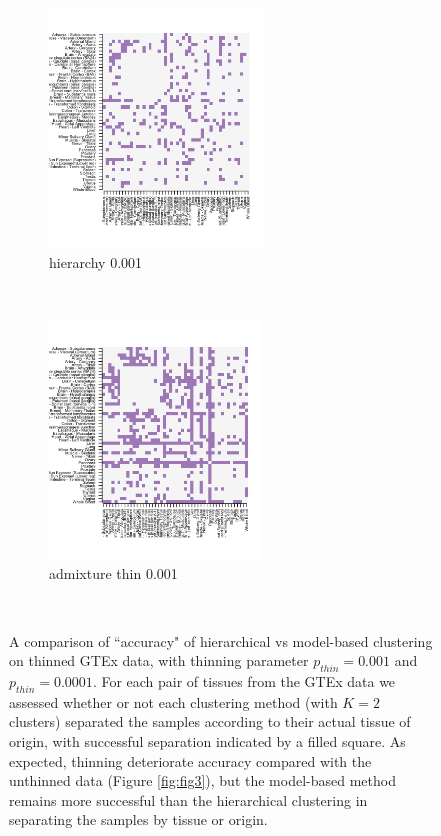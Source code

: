 \begin{figure}[ht]
     \begin{subfigure}[t]{0.5\textwidth}
        \centering
        \includegraphics[height=2.5in]{../plots/rsz_1hierarchy_F_thin_0_001.png}
        \caption{hierarchy 0.001}
    \end{subfigure}%
    ~
    \begin{subfigure}[t]{0.5\textwidth}
        \centering
        \includegraphics[height=2.5in]{../plots/rsz_1admixture_F_thin_0_001.png}
        \caption{admixture thin 0.001}
    \end{subfigure}\\

 \caption{A comparison of ``accuracy" of hierarchical vs model-based clustering on thinned GTEx data, with thinning parameter $p_{thin}=0.001$ and $p_{thin}=0.0001$.  For each pair of tissues from the GTEx data we assessed whether or not each clustering method (with $K=2$ clusters) separated the samples according to their actual tissue of origin, with successful separation indicated by a filled square. As expected, thinning deteriorate accuracy compared with the unthinned data (Figure \ref{fig:fig3}), but the model-based method remains more successful than the hierarchical clustering in separating the samples by tissue or origin.}
 \label{fig:figS2}
\end{figure}



